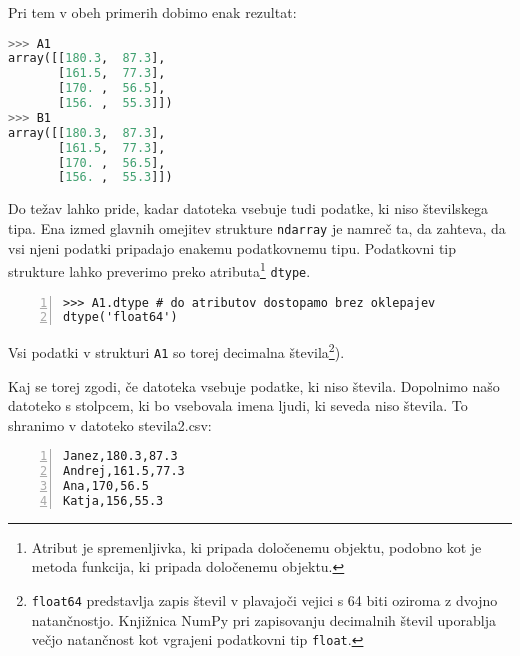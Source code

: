 Pri tem v obeh primerih dobimo enak rezultat:
\begin{lstlisting}[language=Python]
>>> A1
array([[180.3,  87.3],
       [161.5,  77.3],
       [170. ,  56.5],
       [156. ,  55.3]])
>>> B1
array([[180.3,  87.3],
       [161.5,  77.3],
       [170. ,  56.5],
       [156. ,  55.3]])
\end{lstlisting}
Do težav lahko pride, kadar datoteka vsebuje tudi podatke, ki niso številskega tipa. Ena izmed glavnih omejitev strukture \texttt{ndarray} je namreč ta, da zahteva, da vsi njeni podatki pripadajo enakemu podatkovnemu tipu. Podatkovni tip strukture lahko preverimo preko atributa\footnote{Atribut je spremenljivka, ki pripada določenemu objektu, podobno kot je metoda funkcija, ki pripada določenemu objektu.} \texttt{dtype}.  
\begin{lstlisting}[numbers=left]
>>> A1.dtype # do atributov dostopamo brez oklepajev
dtype('float64')
\end{lstlisting}
Vsi podatki v strukturi \texttt{A1} so torej decimalna števila\footnote{\texttt{float64} predstavlja zapis števil v plavajoči vejici s 64 biti oziroma z dvojno natančnostjo. Knjižnica NumPy pri zapisovanju decimalnih števil uporablja večjo natančnost kot vgrajeni podatkovni tip \texttt{float}.}). 

Kaj se torej zgodi, če datoteka vsebuje podatke, ki niso števila. Dopolnimo našo datoteko s stolpcem, ki bo vsebovala imena ljudi, ki seveda niso števila. To shranimo v datoteko {stevila2.csv}:
\begin{lstlisting}[numbers=left]
Janez,180.3,87.3
Andrej,161.5,77.3
Ana,170,56.5
Katja,156,55.3
\end{lstlisting}

